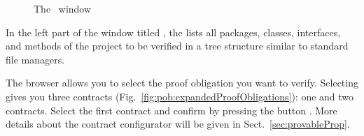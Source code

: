 \begin{enumerate}
  \begin{figure}[hp]
    \centering
    \caption{The \pob\ window}
    \label{fig:proofObligationBrowser}
  \end{figure}

  In the left part of the window titled ,
  the \prm{} lists all packages, classes, interfaces, and methods of the
  project to be verified in a tree structure similar to standard file
  managers.

  The browser allows you to select the proof obligation you want to verify. 
  Selecting  gives you three contracts
  (Fig.~\ref{fig:pob:expandedProofObligations}):
  one 
  and two  contracts. Select the first 
  contract
  and confirm by pressing the button . More details about the
  contract configurator will be given in Sect.~\ref{sec:provableProp}.


\end{enumerate}
